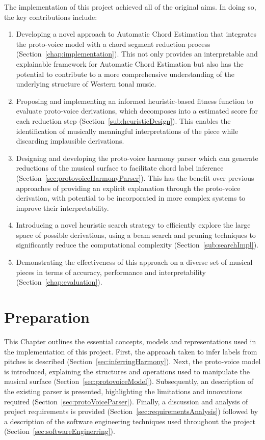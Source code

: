 \documentclass[12pt,a4paper,twoside,openany]{report} \usepackage[pdfborder={0 0 0}]{hyperref}    %
\theoremstyle{definition} \newtheorem{definition}{Definition}[section]
\begin{document}
    The implementation of this project achieved all of the original aims. In doing so, the key contributions include:
    \begin{enumerate}
      \item Developing a novel approach to Automatic Chord Estimation that integrates the proto-voice model with
        a chord segment reduction process (Section~\ref{chap:implementation}). This not only provides an interpretable and explainable
        framework for Automatic Chord Estimation but also has the potential to contribute to a more comprehensive
        understanding of the underlying structure of Western tonal music. 
      \item Proposing and implementing an informed heuristic-based fitness function to evaluate proto-voice
        derivations, which decomposes into a estimated score for each reduction step (Section~\ref{sub:heuristicDesign}). This enables the identification of musically meaningful interpretations of the piece while discarding implausible derivations. 
      \item Designing and developing the proto-voice harmony parser which can generate reductions of the musical surface
        to facilitate chord label inference (Section~\ref{sec:protovoiceHarmonyParser}). 
        This has the benefit over previous approaches of providing an explicit explanation through the proto-voice derivation, with potential to be incorporated in more complex systems to improve their interpretability.
      \item Introducing a novel heuristic search strategy to efficiently explore the large space of possible derivations,
        using a beam search and pruning techniques to significantly reduce the computational complexity (Section~\ref{sub:searchImpl}). 
      \item Demonstrating the effectiveness of this approach on a diverse set of musical pieces in terms of
        accuracy, performance and interpretability (Section~\ref{chap:evaluation}). 
    \end{enumerate}


    \chapter{Preparation}%
    This Chapter outlines the essential concepts, models and representations used in the implementation of this project.
    First, the approach taken to infer labels from pitches is described (Section~\ref{sec:inferringHarmony}).
    Next, the proto-voice model is introduced, explaining the structures and operations used to manipulate the musical surface (Section~\ref{sec:protovoiceModel}). 
    Subsequently, an description of the existing parser is presented, highlighting the limitations and innovations
    required (Section~\ref{sec:protoVoiceParser}).
    Finally, a discussion and analysis of project requirements is provided
    (Section~\ref{sec:requirementsAnalysis}) followed by a description of the software engineering techniques used
    throughout the project (Section~\ref{sec:softwareEnginerring}).
\end{document}

